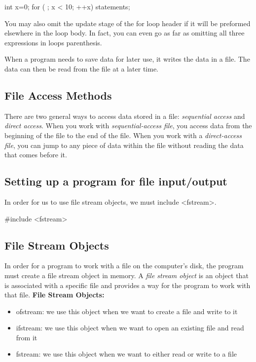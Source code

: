 \documentclass{report}
\begin{document}
    \begin{cppcode}
int x=0;
for ( ; x < 10; ++x) {
    statements;
}

    \end{cppcode}
    
    \bigbreak \noindent 
    You may also omit the update stage of the for loop header if it will be preformed elsewhere in the loop body. In fact, you can even go as far as omitting all three expressions in loops parenthesis.

    \pagebreak
    \bigbreak \noindent 
    \begin{concept}
 When a program needs to save data for later use, it writes the data in a file. The data can then be read from the file at a later time.
	\end{concept}
    \bigbreak \noindent 
    \subsection{File Access Methods}
    \bigbreak \noindent 
    There are two general ways to access data stored in a file: \textit{sequential access} and \textit{direct access}. When you work with \textit{sequential-access file}, you access data from the beginning of the file to the end of the file.
    \bigbreak \noindent 
    When you work with a \textit{direct-access file}, you can jump to any piece  of data within the file without reading the data that comes before it.
    \bigbreak \noindent 
    \subsection{Setting up a program for file input/output}
    \bigbreak \noindent 
    In order for us to use file stream objects, we must include <fstream>.
    \bigbreak \noindent 
    
    \begin{cppcode}
#include <fstream>
    \end{cppcode}
    
    \bigbreak \noindent 
    \subsection{File Stream Objects}
    \bigbreak \noindent 
    In order for a program to work with a file on the computer's disk, the program must create a file stream object in memory. A \textit{file stream object} is an object that is associated with a specific file and provides a way for the program to work with that file. 
    \bigbreak \noindent 
    \textbf{File Stream Objects:}
    \begin{itemize}
        \item ofstream: we use this object when we want to create a file and write to it
        \item ifstream: we use this object when we want to open an existing file and read from it
        \item fstream: we use this object when we want to either read or write to a file
    \end{itemize}
\end{document}
